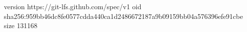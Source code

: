version https://git-lfs.github.com/spec/v1
oid sha256:959bb46dc8fe0577cdda440ca1d2486672187a9b09159bb04a576396efe91cbe
size 131168
